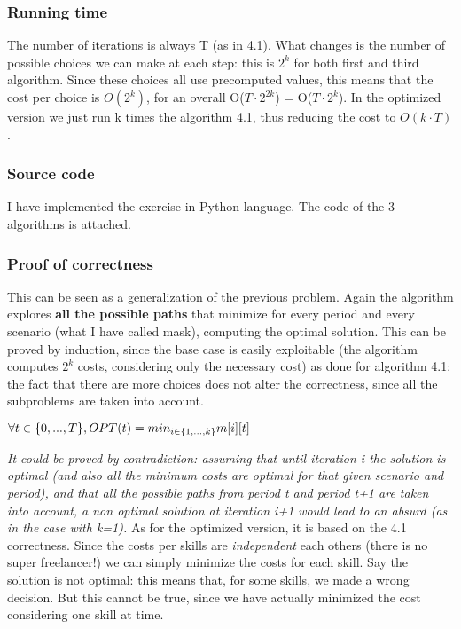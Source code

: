 \subsubsection{Running time}
The number of iterations is always T (as in 4.1). What changes is the number of possible choices we can make at each step: this is $2^k$ for both first and third algorithm. Since these choices all use precomputed values, this means that the cost per choice is $O(2^k)$, for an overall O($T \cdot 2^{2k}$) = O($T \cdot 2^k$). In the optimized version we just run k times the algorithm 4.1, thus reducing the cost to $O(k \cdot T)$.

\subsubsection{Source code}
I have implemented the exercise in Python language. The code of the 3 algorithms is attached.

\subsubsection{Proof of correctness}
This can be seen as a generalization of the previous problem. Again the algorithm explores \textbf{all the possible paths} that minimize for every period and every scenario (what I have called mask), computing the optimal solution. This can be proved by induction, since the base case is easily exploitable (the algorithm computes $2^k$ costs, considering only the necessary cost) as done for algorithm 4.1: the fact that there are more choices does not alter the correctness, since all the subproblems are taken into account. 

$\newline \forall t \in \{0,..., T\}, OPT(t) = min_{i \in \{1,...,k\}} m[i][t]  \newline$

\textit{It could be proved by contradiction: assuming that until iteration i the solution is optimal (and also all the minimum costs are optimal for that given scenario and period), and that all the possible paths from period t and period t+1 are taken into account, a non optimal solution at iteration i+1 would lead to an absurd (as in the case with k=1).}
As for the optimized version, it is based on the 4.1 correctness. Since the costs per skills are \textit{independent} each others (there is no super freelancer!) we can simply minimize the costs for each skill. Say the solution is not optimal: this means that, for some skills, we made a wrong decision. But this cannot be true, since we have actually minimized the cost considering one skill at time.